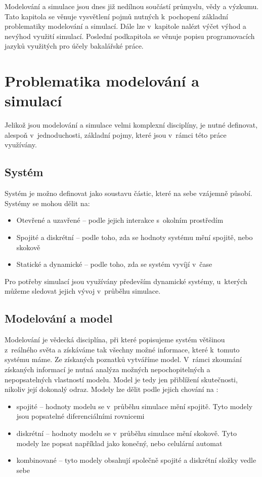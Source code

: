 Modelování a simulace jsou dnes již nedílnou součástí průmyslu, vědy a výzkumu. Tato kapitola se věnuje vysvětlení pojmů nutných k~pochopení základní problematiky modelování a simulací. Dále lze v~kapitole nalézt výčet výhod a nevýhod využití simulací. Poslední podkapitola se věnuje popisu programovacích jazyků využitých pro účely bakalářské práce.

\section{Problematika modelování a simulací}
Jelikož jsou modelování a simulace velmi komplexní disciplíny, je nutné definovat, alespoň v~jednoduchosti, základní pojmy, které jsou v~rámci této práce využívány.

\subsection{Systém}
Systém \cite{IMS-skripta} je možno definovat jako soustavu částic, které na sebe vzájemně působí. Systémy se mohou dělit na:

\begin{itemize}
    \item Otevřené a uzavřené -- podle jejich interakce s~okolním prostředím
    \item Spojité a diskrétní -- podle toho, zda se hodnoty systému mění spojitě, nebo skokově
    \item Statické a dynamické -- podle toho, zda se systém vyvíjí v~čase
\end{itemize}
Pro potřeby simulací jsou využívány především dynamické systémy, u~kterých můžeme sledovat jejich vývoj v~průběhu simulace.

\subsection{Modelování a model}
\label{modelovani}
Modelování je vědecká disciplína, při které popisujeme systém většinou z~reálného světa a získáváme tak všechny možné informace, které k~tomuto systému máme. Ze získaných poznatků vytváříme model. V~rámci zkoumání získaných informací je nutná analýza možných nepochopitelných a nepopsatelných vlastností modelu. Model je tedy jen přiblížení skutečnosti, nikoliv její dokonalý odraz. Modely lze dělit podle jejich chování na \cite{IMS-skripta}:

\begin{itemize}
    \item spojité -- hodnoty modelu se v~průběhu simulace mění spojitě. Tyto modely jsou popsatelné diferenciálními rovnicemi
    \item diskrétní -- hodnoty modelu se v~průběhu simulace mění skokově. Tyto modely lze popsat například jako konečný, nebo celulární automat
    \item kombinované -- tyto modely obsahují společně spojité a diskrétní složky vedle sebe
\end{itemize}

